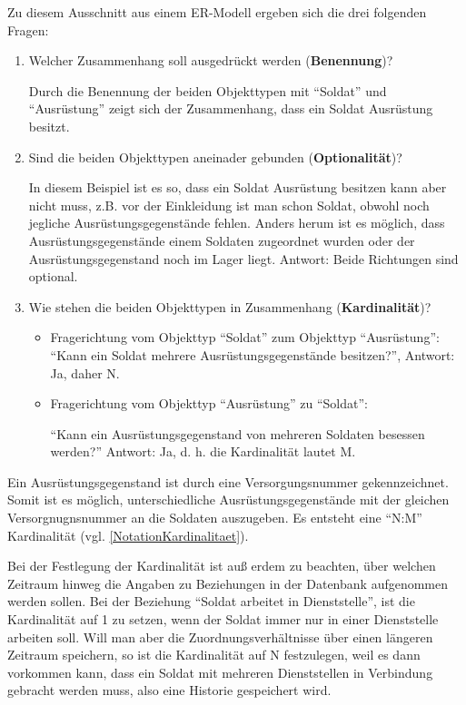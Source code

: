         Zu diesem Ausschnitt aus einem ER-Modell ergeben sich die drei folgenden Fragen:
        \begin{enumerate}
          \item Welcher Zusammenhang soll ausgedrückt werden (\textbf{Benennung})?

          Durch die Benennung der beiden Objekttypen mit \enquote{Soldat} und \enquote{Ausrüstung} zeigt sich der Zusammenhang, dass ein Soldat Ausrüstung besitzt.
          \item Sind die beiden Objekttypen aneinader gebunden (\textbf{Optionalität})?

          In diesem Beispiel ist es so, dass ein Soldat Ausrüstung besitzen kann aber nicht muss, z.B. vor der Einkleidung ist man schon Soldat, obwohl noch jegliche Ausrüstungsgegenstände fehlen. Anders herum ist es möglich, dass Ausrüstungsgegenstände einem Soldaten
          zugeordnet wurden oder der Ausrüstungsgegenstand noch im Lager liegt.
          Antwort: Beide Richtungen sind optional.
          \item Wie stehen die beiden Objekttypen in Zusammenhang (\textbf{Kardinalität})?

          \begin{itemize}
            \item Fragerichtung vom Objekttyp \enquote{Soldat}  zum Objekttyp \enquote{Ausrüstung}:
            \enquote{Kann ein Soldat mehrere Ausrüstungsgegenstände besitzen?}, Antwort: Ja, daher N.
            \item Fragerichtung vom Objekttyp \enquote{Ausrüstung}  zu \enquote{Soldat}:

            \enquote{Kann ein Ausrüstungsgegenstand von mehreren Soldaten besessen werden?}
            Antwort: Ja, d. h. die Kardinalität lautet M.
          \end{itemize}
        \end{enumerate}
        Ein Ausrüstungsgegenstand ist durch eine Versorgungsnummer
        gekennzeichnet. Somit ist es möglich, unterschiedliche
        Ausrüstungsgegenstände mit der gleichen Versorgnugnsnummer an die
        Soldaten auszugeben. Es entsteht eine \enquote{N:M} Kardinalität (vgl.
        \ref{NotationKardinalitaet}).

        Bei der Festlegung der Kardinalität ist auß erdem zu beachten,
        über welchen Zeitraum hinweg die Angaben zu Beziehungen in der
        Datenbank aufgenommen werden sollen. Bei der Beziehung \enquote{Soldat
        arbeitet in Dienststelle}, ist die Kardinalität auf 1 zu setzen, wenn
        der Soldat immer nur in einer Dienststelle arbeiten soll. Will man aber
        die Zuordnungsverhältnisse über einen längeren Zeitraum speichern,
        so ist die Kardinalität auf N festzulegen, weil es dann vorkommen
        kann, dass ein Soldat mit mehreren Dienststellen in Verbindung gebracht
        werden muss, also eine Historie gespeichert wird.
